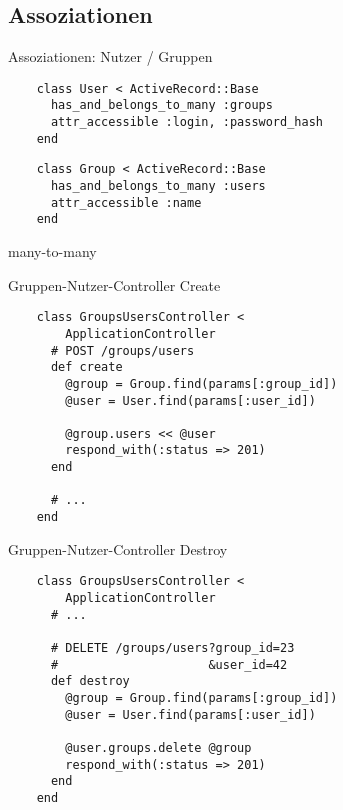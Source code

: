 \subsection{Assoziationen}

\begin{Frame}[fragile]{Assoziationen: Nutzer / Gruppen}
  \begin{lstlisting}
    class User < ActiveRecord::Base
      has_and_belongs_to_many :groups
      attr_accessible :login, :password_hash
    end
  \end{lstlisting}

  \begin{lstlisting}
    class Group < ActiveRecord::Base
      has_and_belongs_to_many :users
      attr_accessible :name
    end
  \end{lstlisting}
\end{Frame}

\begin{Frame}{many-to-many}
  \begin{center}
    
  \end{center}
\end{Frame}

\begin{Frame}[fragile]{Gruppen-Nutzer-Controller Create}
  \begin{lstlisting}
    class GroupsUsersController < 
        ApplicationController
      # POST /groups/users
      def create
        @group = Group.find(params[:group_id])
        @user = User.find(params[:user_id])

        @group.users << @user
        respond_with(:status => 201)
      end

      # ...
    end
  \end{lstlisting}
\end{Frame}

\begin{Frame}[fragile]{Gruppen-Nutzer-Controller Destroy}
  \begin{lstlisting}
    class GroupsUsersController < 
        ApplicationController
      # ...

      # DELETE /groups/users?group_id=23
      #                     &user_id=42
      def destroy
        @group = Group.find(params[:group_id])
        @user = User.find(params[:user_id])

        @user.groups.delete @group
        respond_with(:status => 201)
      end
    end
  \end{lstlisting}
\end{Frame}

